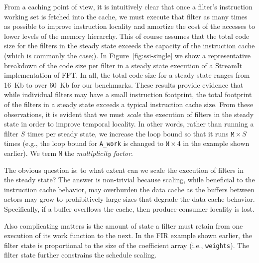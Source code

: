 From a caching point of view, it is intuitively clear that once a
filter's instruction working set is fetched into the cache, we must
execute that filter as many times as possible to improve instruction
locality and amortize the cost of the accesses to lower levels of the
memory hierarchy. This of course assumes that the total code size for
the filters in the steady state exceeds the capacity of the
instruction cache (which is commonly the case;). In
Figure~\ref{fig:ssi-single} we show a representative breakdown of the
code size per filter in a steady state execution of a StreamIt
implementation of FFT. In all, the total code size for a steady state
ranges from 16~Kb to over 60~Kb for our benchmarks. These results
provide evidence that while individual filters may have a
small instruction footprint, the total footprint of the filters in a
steady state exceeds a typical instruction cache size.
From these observations, it is evident that we must {\it scale} the
execution of filters in the steady state in order to improve temporal
locality. In other words, rather than running a filter $S$ times per
steady state, we increase the loop bound so that it runs $\texttt{M}
\times S$ times (e.g., the loop bound for \verb+A_work+ is
changed to $\texttt{M} \times 4$ in the example shown earlier). 
We term \texttt{M} the {\it multiplicity factor}.

The obvious question is: to what extent can we scale the execution of
filters in the steady state? The answer is non-trivial because
scaling, while beneficial to the instruction cache behavior, may
overburden the data cache as the buffers between actors may grow to
prohibitively large sizes that degrade the data cache
behavior. Specifically, if a buffer overflows the cache, then
produce-consumer locality is lost. 

Also complicating matters is the amount of state a filter must retain
from one execution of its work function to the next. In the FIR
example shown earlier, the filter state is proportional to the size of
the coefficient array (i.e., \texttt{weights}). The filter state
further constrains the schedule scaling.
